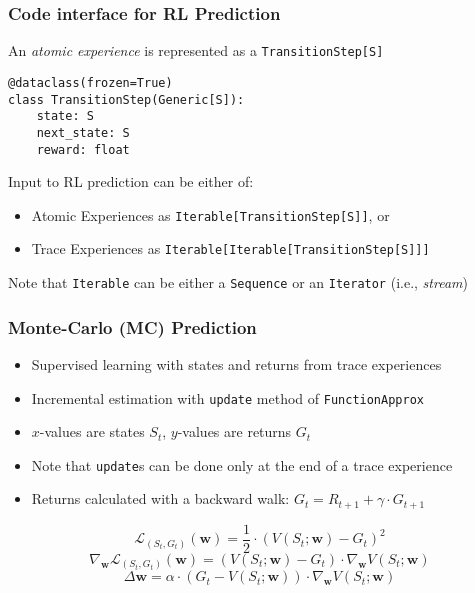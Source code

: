 \documentclass[handout]{beamer}
\begin{document}
\begin{frame}[fragile]
\frametitle{Code interface for RL Prediction}
\pause
An {\em atomic experience} is represented as a \lstinline{TransitionStep[S]}
\pause
\begin{lstlisting}
@dataclass(frozen=True)
class TransitionStep(Generic[S]):
    state: S
    next_state: S
    reward: float
\end{lstlisting}
\pause
\vspace{3mm}
Input to RL prediction can be either of:
\pause
\begin{itemize}[<+->]
\item Atomic Experiences as \lstinline{Iterable[TransitionStep[S]]}, or
\item Trace Experiences as \lstinline{Iterable[Iterable[TransitionStep[S]]]}
\end{itemize}
\pause
\vspace{3mm}
Note that \lstinline{Iterable} can be either a \lstinline{Sequence} or an \lstinline{Iterator} (i.e., {\em stream})
\end{frame}


\begin{frame}
\frametitle{Monte-Carlo (MC) Prediction}
\pause
\begin{itemize}[<+->]
\item Supervised learning with states and returns from trace experiences
\item Incremental estimation with \lstinline{update} method of \lstinline{FunctionApprox}
\item $x$-values are states $S_t$, $y$-values are returns $G_t$
\item Note that \lstinline{update}s can be done only at the end of a trace experience
\item Returns calculated with a backward walk: $G_t = R_{t+1} + \gamma \cdot G_{t+1}$
\end{itemize}
\pause
$$\mathcal{L}_{(S_t,G_t)}(\bm{w}) = \frac 1 2 \cdot (V(S_t;\bm{w}) - G_t)^2$$
\pause
$$\nabla_{\bm{w}} \mathcal{L}_{(S_t,G_t)}(\bm{w}) = (V(S_t;\bm{w}) - G_t) \cdot \nabla_{\bm{w}} V(S_t;\bm{w})$$
\pause
$$\Delta \bm{w} = \alpha \cdot (G_t - V(S_t;\bm{w})) \cdot \nabla_{\bm{w}} V(S_t;\bm{w})$$
\end{frame}
\end{document}
